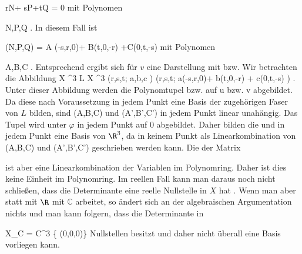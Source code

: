 {\mavergleichskettedisp
{\vergleichskette
{ rN+ sP+tQ
}
{ =} { 0
}
{ } {
}
{ } {
}
{ } {
}
}
{}{}{}
mit Polynomen

\mavergleichskette
{\vergleichskette
{N,P,Q
}
{ \in }{ \R[r,s,t]
}
{  }{
}
{    }{
}
{   }{
}
}
{}{}{.}
In diesem Fall ist
 {} {}

\mavergleichskettedisp
{\vergleichskette
{(N,P,Q)
}
{ =} { A (-s,r,0)+ B(t,0,-r) +C(0,t,-s)
}
{ } {
}
{ } {
}
{ } {
}
}
{}{}{}
mit Polynomen

\mavergleichskette
{\vergleichskette
{A,B,C
}
{ \in }{ \R[r,s,t]
}
{  }{
}
{    }{
}
{   }{
}
}
{}{}{.}
Entsprechend ergibt sich für $v$ eine Darstellung mit
 bzw.
 Wir betrachten die Abbildung
\maabbeledisp {\varphi} {X \times \R^3} { L \subseteq X \times \R^3
} {(r,s,t; a,b,c )} { (r,s,t; a(-s,r,0)+ b(t,0,-r) + c(0,t,-s)  )
} {.}
Unter dieser Abbildung werden die Polynomtupel
 bzw.
 {} {}
auf
\mathkor {} {u} {bzw.} {v} {}
abgebildet. Da diese nach Voraussetzung in jedem Punkt eine Basis der zugehörigen Faser  von $L$ bilden, sind
\mathkor {} {(A,B,C)} {und} {(A',B',C')} {}
in jedem Punkt linear unahängig. Das Tupel
 wird unter $\varphi$ in jedem Punkt auf $0$
 {} {}
abgebildet. Daher bilden die
 und
 in jedem Punkt eine Basis von $\R^3$, da
 in keinem Punkt als Linearkombination von
\mathkor {} {(A,B,C)} {und} {(A',B',C')} {}
geschrieben werden kann. Die
der Matrix

 {  }

ist aber eine Linearkombination der Variablen
 im Polynomring. Daher ist dies keine Einheit im Polynomring. Im reellen Fall kann man daraus noch nicht schließen, dass die Determinante eine reelle Nullstelle in $X$ hat
 {} {.}
Wenn man aber statt mit $\R$ mit ${\mathbb C}$ arbeitet, so ändert sich an der algebraischen Argumentation nichts und man kann folgern, dass die Determinante in

\mavergleichskettedisp
{\vergleichskette
{ X_{\mathbb C}
}
{ =} { {\mathbb C}^3 \setminus \{ (0,0,0)\}
}
{ } {
}
{ } {
}
{ } {
}
}
{}{}{}
Nullstellen besitzt und daher nicht überall eine Basis vorliegen kann.





}

